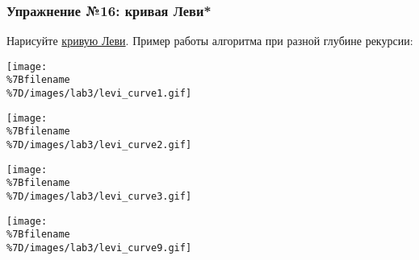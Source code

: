 \subsubsection{Упражнение №16: кривая
Леви*}\label{ux443ux43fux440ux430ux436ux43dux435ux43dux438ux435-16-ux43aux440ux438ux432ux430ux44f-ux43bux435ux432ux438}

Нарисуйте
\href{https://wikipedia.org/ru/\%D0\%9A\%D1\%80\%D0\%B8\%D0\%B2\%D0\%B0\%D1\%8F_\%D0\%9B\%D0\%B5\%D0\%B2\%D0\%B8}{кривую
Леви}. Пример работы алгоритма при разной глубине рекурсии:

\texttt{[image: \\\%7Bfilename\\\%7D/images/lab3/levi\_curve1.gif]}

\texttt{[image: \\\%7Bfilename\\\%7D/images/lab3/levi\_curve2.gif]}

\texttt{[image: \\\%7Bfilename\\\%7D/images/lab3/levi\_curve3.gif]}

\texttt{[image: \\\%7Bfilename\\\%7D/images/lab3/levi\_curve9.gif]}

\begin{Shaded}
\begin{Highlighting}[]
 

 
     \OperatorTok{==} \NormalTok{:}
    \NormalTok{)}
    \OperatorTok{/}\OperatorTok{**}\NormalTok{)}
    \NormalTok{)}
    \OperatorTok{/}\OperatorTok{**}\NormalTok{)}
    \NormalTok{)}

\OperatorTok{=} 
\OperatorTok{=} 

\NormalTok{)}

\OperatorTok{-}\OperatorTok{/}\NormalTok{, }\OperatorTok{-}\OperatorTok{/}\NormalTok{)}

\end{Highlighting}
\end{Shaded}

